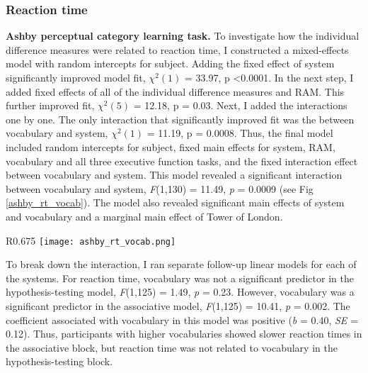 \documentclass[../dissertation.tex]{subfiles}
\begin{document}
\subsubsection{Reaction time}

\textbf{Ashby perceptual category learning task.}  To investigate how the individual difference measures were related to reaction time, I constructed a mixed-effects model with random intercepts for subject. Adding the fixed effect of system significantly improved model fit,  $\chi^{2}(1)$ = 33.97, p \textless 0.0001. In the next step, I added fixed effects of all of the individual difference measures and RAM. This further improved fit, $\chi^{2}(5)$ = 12.18, p = 0.03. Next, I added the interactions one by one. The only interaction that significantly improved fit was the between vocabulary and system, $\chi^{2}(1)$ = 11.19, p = 0.0008. Thus, the final model included random intercepts for subject, fixed main effects for system, RAM, vocabulary and all three executive function tasks, and the fixed interaction effect between vocabulary and system. This model revealed a significant interaction between vocabulary and system, \textit{F}(1,130) = 11.49, \textit{p} = 0.0009 (see Fig \ref{ashby_rt_vocab}). The model also revealed significant main effects of system and vocabulary and a marginal main effect of Tower of London. \par 


\begin{wrapfigure}{R}{0.675\textwidth}
\texttt{[image: ashby\_rt\_vocab.png]}
\caption[Relationships between Ashby reaction time and vocabulary]{Vocabulary is a significant predictor of reaction time in the Ashby perceptual category learning task for the associative block, but not for the hypothesis-testing block.}
\label{ashby_rt_vocab}
\vspace{-10pt}
\end{wrapfigure}	


	To break down the interaction, I ran separate follow-up linear models for each of the systems. For reaction time, vocabulary was not a significant predictor in the hypothesis-testing model, \textit{F}(1,125) = 1.49, \textit{p} = 0.23.  However, vocabulary was a significant predictor in the associative model, \textit{F}(1,125) = 10.41, \textit{p} = 0.002. The coefficient associated with vocabulary in this model was positive (\textit{b} = 0.40, \textit{SE} = 0.12). Thus, participants with higher vocabularies showed slower reaction times in the associative block, but reaction time was not related to vocabulary in the hypothesis-testing block.\par 
	
\end{document}
